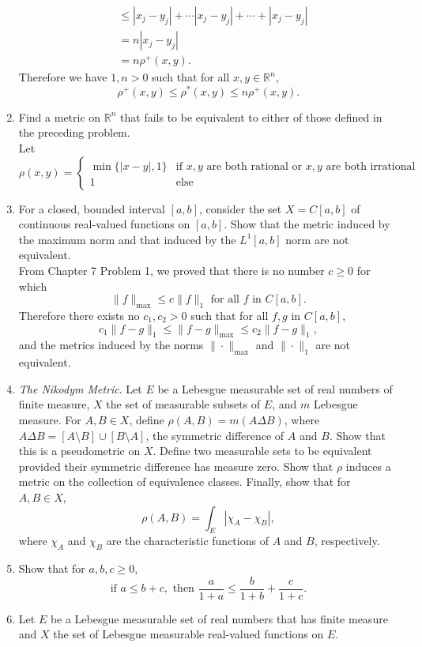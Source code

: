 \begin{enumerate}
\begin{align*}
        &\le |x_j-y_j| + \cdots|x_j-y_j|+\cdots + |x_j-y_j|\\
        &= n|x_j-y_j|\\
        &=n\rho^+(x,y).
    \end{align*}
    Therefore we have $1,n>0$ such that for all $x,y\in \mathbb{R}^n$,
    \[
        \rho^+(x,y)\le\rho^*(x,y)\le n\rho^+(x,y).
    \]
    \item Find a metric on $\mathbb{R}^n$ that fails to be equivalent to either of those defined in the preceding problem.\\
    Let 
    \[
    \rho(x,y)=
    \begin{cases}
        \min\{|x-y|,1\}&\text{if $x,y$ are both rational or $x,y$ are both irrational}\\
        1&\text{else}
    \end{cases}    
    \]
    \item For a closed, bounded interval $[a,b]$, consider the set $X=C[a,b]$ of continuous real-valued functions on $[a,b]$.
    Show that the metric induced by the maximum norm and that induced by the $L^1[a,b]$ norm are not equivalent.\\
    From Chapter 7 Problem 1, we proved that there is no number $c \ge 0$ for which
	\[
	\| f \|_{\max}	\le c \| f \|_1 \text{ for all $f$ in $C[a,b]$}.
	\]
    Therefore there exists no $c_1,c_2>0$ such that for all $f,g$ in $C[a,b]$,
    \[
        c_1\| f-g \|_1 \le \| f-g \|_{\max}	\le c_2 \| f-g \|_1,
	\]
    and the metrics induced by the norms $\| \cdot \|_{\max}$ and $\| \cdot \|_1$ are not equivalent.
    \item \textit{The Nikodym Metric}. Let $E$ be a Lebesgue measurable set of real numbers of finite measure, $X$ the set of measurable subsets of $E$, and $m$ Lebesgue measure.
    For $A,B\in X$, define $\rho(A,B)=m(A\Delta B)$, where $A\Delta B = [A\setminus B]\cup[B\setminus A]$, the symmetric difference of $A$ and $B$.
    Show that this is a pseudometric on $X$.
    Define two measurable sets to be equivalent provided their symmetric difference has measure zero.
    Show that $\rho$ induces a metric on the collection of equivalence classes.
    Finally, show that for $A,B\in X$, 
    \[
    \rho(A,B)=\int_E|\chi_A-\chi_B|,    
    \]
    where $\chi_A$ and $\chi_B$ are the characteristic functions of $A$ and $B$, respectively.
    \item Show that for $a,b,c\ge0$,
    \[
    \text{if }a\le b+c,\text{ then }\frac{a}{1+a}\le\frac{b}{1+b}+\frac{c}{1+c}.
    \]
    \item Let $E$ be a Lebesgue measurable set of real numbers that has finite measure and $X$ the set of Lebesgue measurable real-valued functions on $E$.

\end{enumerate}
